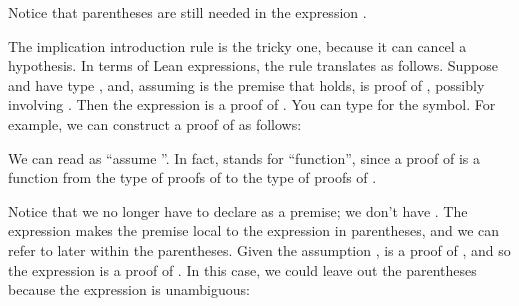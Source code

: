 \documentclass[letterpaper,10pt,english]{sphinxmanual}
\begin{document}
\sphinxAtStartPar
Notice that parentheses are still needed in the expression .

\sphinxAtStartPar
The implication introduction rule is the tricky one,
because it can cancel a hypothesis.
In terms of Lean expressions,
the rule translates as follows.
Suppose  and  have type ,
and, assuming  is the premise that  holds,
 is proof of , possibly involving .
Then the expression  is a proof of .
You can type  for the  symbol.
For example, we can construct a proof of  as follows:

\begin{sphinxVerbatim}[commandchars=\\\{\}]
        
\end{sphinxVerbatim}

\sphinxAtStartPar
We can read  as “assume ”.
In fact,  stands for “function”,
since a proof of  is a function from the type of
proofs of  to the type of proofs of .

\sphinxAtStartPar
Notice that we no longer have to declare  as a premise;
we don’t have .
The expression 
makes the premise  local to the expression in parentheses,
and we can refer to  later within the parentheses.
Given the assumption ,
 is a proof of ,
and so the expression 
is a proof of .
In this case,
we could leave out the parentheses because the expression is unambiguous:
\end{document}
